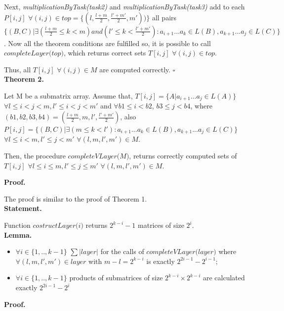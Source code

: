 \documentclass{article}
\begin{document}
Next, \textit{multiplicationByTask(task2)} and \textit{multiplicationByTask(task3)} add to each $P[i, j]$ \linebreak $\forall (i, j) \in top = \{(l, \frac{l+m}{2}, \frac{l'+m'}{2}, m'))\}$ all pairs $\{(B, C) |\exists (\frac{l+m}{2} \le k < m) and (l' \le k < \frac{l'+m'}{2}) : a_{i + 1}...a_{k} \in L(B), a_{k + 1}...a_{j} \in L(C)\}$. Now all the theorem conditions are fulfilled so, it is possible to call $\textit{completeLayer(top)}$, which returns correct sets $T[i, j]$ $\forall (i, j) \in top$. 

Thus, all $T[i, j]$ $\forall (i, j) \in M$ are computed correctly. $\square$\\

\textbf{Theorem 2.}

Let M be a submatrix array. Assume that, $T[i, j] =  \{ A |  a_{i + 1}...a_{j} \in L(A)\}$ $\forall l \leq i < j < m,  l' \leq i < j < m'$ and $\forall b1 \leq i < b2$,  $b3 \leq j < b4$, where $(b1, b2, b3, b4) = (\frac{l+m}{2}, m, l', \frac{l'+m'}{2})$, also $P[i, j] =  \{ (B, C) |\exists (m \le k < l'): a_{i + 1}...a_{k} \in L(B), a_{k + 1}...a_{j} \in L(C)\}$ $\forall l \leq i < m,  l' \leq j < m'$ $\forall (l, m, l', m') \in M$.

Then, the procedure $\textit{completeVLayer(M)}$, returns correctly computed sets of $T[i, j]$ $\forall l \leq i \le m,  l' \leq j \le m'$ $\forall (l, m, l', m') \in M$. 

\textbf{Proof.}

The proof is similar to the proof of Theorem 1. \\

\textbf{Statement.}

Function $\textit{costructLayer(i)}$ returns $2^{k - i} - 1$ matrices of size $2^i$.\\

\textbf{Lemma.}

 \begin{itemize}
 \item $\forall i \in \{ 1, .., k - 1\}$  $\sum{|layer|}$ for the calls of $\textit{completeVLayer(layer)}$ where $\forall (l, m, l', m') \in layer$ with $m - l = 2^{k - i}$  is exactly $2^{2i - 1} - 2^{i - 1}$;
 \item $\forall i \in \{ 1, .., k - 1\}$ products of submatrices of size $2^{k - i} \times 2^{k - i}$ are calculated exactly $2^{2i - 1} - 2^{i}$
 \end{itemize}

\textbf{Proof.}
\end{document}

